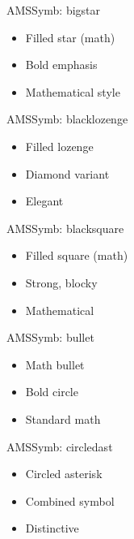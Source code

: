 \documentclass[12pt]{beamer}
\begin{document}
\begin{frame}{AMSSymb: bigstar}
\begin{itemize}
  \item Filled star (math)
  \item Bold emphasis
  \item Mathematical style
\end{itemize}
\end{frame}

\begin{frame}{AMSSymb: blacklozenge}
\begin{itemize}
  \item Filled lozenge
  \item Diamond variant
  \item Elegant
\end{itemize}
\end{frame}

\begin{frame}{AMSSymb: blacksquare}
\begin{itemize}
  \item Filled square (math)
  \item Strong, blocky
  \item Mathematical
\end{itemize}
\end{frame}

\begin{frame}{AMSSymb: bullet}
\begin{itemize}
  \item Math bullet
  \item Bold circle
  \item Standard math
\end{itemize}
\end{frame}

\begin{frame}{AMSSymb: circledast}
\begin{itemize}
  \item Circled asterisk
  \item Combined symbol
  \item Distinctive
\end{itemize}
\end{frame}

\end{document}
